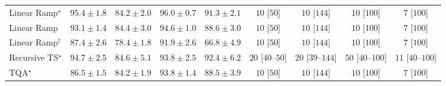 \begin{tabular}{l|cccc|cccc|}
Linear Ramp$^\star$ & {\cellcolor[HTML]{670864}} \color[HTML]{F1F1F1} $95.4\pm 1.8$ & {\cellcolor[HTML]{8A55A7}} \color[HTML]{F1F1F1} $84.2\pm 2.0$ & {\cellcolor[HTML]{62065F}} \color[HTML]{F1F1F1} $96.0\pm 0.7$ & {\cellcolor[HTML]{831A83}} \color[HTML]{F1F1F1} $91.3\pm 2.1$ & {\cellcolor[HTML]{FFF6F2}} \color[HTML]{000000} $10$ [$50$] & {\cellcolor[HTML]{FFF6F2}} \color[HTML]{000000} $10$ [$144$] & {\cellcolor[HTML]{FFF6F2}} \color[HTML]{000000} $10$ [$100$] & {\cellcolor[HTML]{FFF6F2}} \color[HTML]{000000} $7$ [$100$] \\
Linear Ramp & {\cellcolor[HTML]{7C0E78}} \color[HTML]{F1F1F1} $93.1\pm 1.4$ & {\cellcolor[HTML]{8A52A5}} \color[HTML]{F1F1F1} $84.4\pm 3.0$ & {\cellcolor[HTML]{6F0A6B}} \color[HTML]{F1F1F1} $94.6\pm 1.0$ & {\cellcolor[HTML]{863293}} \color[HTML]{F1F1F1} $88.6\pm 3.0$ & {\cellcolor[HTML]{FFF6F2}} \color[HTML]{000000} $10$ [$50$] & {\cellcolor[HTML]{FFF6F2}} \color[HTML]{000000} $10$ [$144$] & {\cellcolor[HTML]{FFF6F2}} \color[HTML]{000000} $10$ [$100$] & {\cellcolor[HTML]{FFF6F2}} \color[HTML]{000000} $7$ [$100$] \\
Linear Ramp$^\dagger$ & {\cellcolor[HTML]{873D9A}} \color[HTML]{F1F1F1} $87.4\pm 2.6$ & {\cellcolor[HTML]{8C80BB}} \color[HTML]{F1F1F1} $78.4\pm 1.8$ & {\cellcolor[HTML]{821580}} \color[HTML]{F1F1F1} $91.9\pm 2.6$ & {\cellcolor[HTML]{AEC7E0}} \color[HTML]{000000} $66.8\pm 4.9$ & {\cellcolor[HTML]{FFF6F2}} \color[HTML]{000000} $10$ [$50$] & {\cellcolor[HTML]{FFF6F2}} \color[HTML]{000000} $10$ [$144$] & {\cellcolor[HTML]{FFF6F2}} \color[HTML]{000000} $10$ [$100$] & {\cellcolor[HTML]{FFF6F2}} \color[HTML]{000000} $7$ [$100$] \\
Recursive TS$^\star$ & {\cellcolor[HTML]{6E096A}} \color[HTML]{F1F1F1} $94.7\pm 2.5$ & {\cellcolor[HTML]{8A51A5}} \color[HTML]{F1F1F1} $84.6\pm 5.1$ & {\cellcolor[HTML]{760C71}} \color[HTML]{F1F1F1} $93.8\pm 2.5$ & {\cellcolor[HTML]{81117D}} \color[HTML]{F1F1F1} $92.4\pm 6.2$ & {\cellcolor[HTML]{FFF3EF}} \color[HTML]{000000} $20$ [$40$--$50$] & {\cellcolor[HTML]{FFF3EF}} \color[HTML]{000000} $20$ [$39$--$144$] & {\cellcolor[HTML]{FEEBE8}} \color[HTML]{000000} $50$ [$40$--$100$] & {\cellcolor[HTML]{FFF5F1}} \color[HTML]{000000} $11$ [$40$--$100$] \\
TQA$^\star$ & {\cellcolor[HTML]{88449E}} \color[HTML]{F1F1F1} $86.5\pm 1.5$ & {\cellcolor[HTML]{8A55A7}} \color[HTML]{F1F1F1} $84.2\pm 1.9$ & {\cellcolor[HTML]{760C71}} \color[HTML]{F1F1F1} $93.8\pm 1.4$ & {\cellcolor[HTML]{863394}} \color[HTML]{F1F1F1} $88.5\pm 3.9$ & {\cellcolor[HTML]{FFF6F2}} \color[HTML]{000000} $10$ [$50$] & {\cellcolor[HTML]{FFF6F2}} \color[HTML]{000000} $10$ [$144$] & {\cellcolor[HTML]{FFF6F2}} \color[HTML]{000000} $10$ [$100$] & {\cellcolor[HTML]{FFF6F2}} \color[HTML]{000000} $7$ [$100$] \\

\end{tabular}
